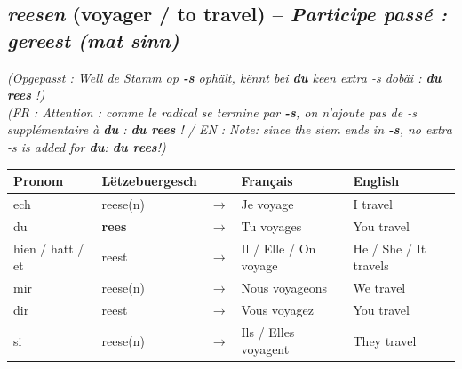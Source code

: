 \subsection{\textit{reesen} (voyager / to travel) -- \textit{Participe passé : gereest (mat sinn)}}
\textit{(Opgepasst : Well de Stamm op \textbf{-s} ophält, kënnt bei \textbf{du} keen extra \textit{-s} dobäi : \textbf{du rees} !)} \\
\textit{\small(FR : Attention : comme le radical se termine par \textbf{-s}, on n'ajoute pas de \textit{-s} supplémentaire à \textbf{du} : \textbf{du rees} ! / EN : Note: since the stem ends in \textbf{-s}, no extra \textit{-s} is added for \textbf{du}: \textbf{du rees}!)}
\begin{center}
    \begin{tabular}{ll c l l}
        \toprule
        \textbf{Pronom} & \textbf{Lëtzebuergesch} & & \textbf{Français} & \textbf{English} \\
        \midrule
        ech & reese(n) & $\rightarrow$ & Je voyage & I travel \\
        du & \textbf{rees} & $\rightarrow$ & Tu voyages & You travel \\
        hien / hatt / et & reest & $\rightarrow$ & Il / Elle / On voyage & He / She / It travels \\
        \midrule
        mir & reese(n) & $\rightarrow$ & Nous voyageons & We travel \\
        dir & reest & $\rightarrow$ & Vous voyagez & You travel \\
        si & reese(n) & $\rightarrow$ & Ils / Elles voyagent & They travel \\
        \bottomrule
    \end{tabular}
\end{center}

